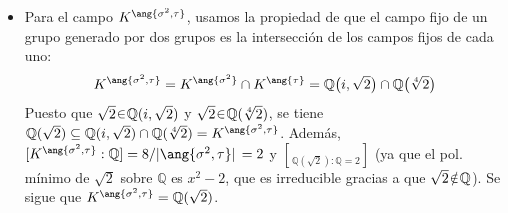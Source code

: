 \begin{sol}
\begin{enumerate}[label=\alph*)]
\begin{itemize}
    \item 
    Para el campo $K^{\ang{\sigma^2,\tau}}$, usamos la propiedad de que el campo fijo de un grupo generado por dos grupos es la intersección de los campos fijos de cada uno: 
    \[
    K^{\ang{\sigma^2,\tau}} = K^{\ang{\sigma^2}} \cap K^{\ang{\tau}} = \mathbb{Q}\big(i,\sqrt{2}\big) \cap \mathbb{Q}\big(\sqrt[4]{2}\big)
    \]
    Puesto que $\sqrt{2} \en \mathbb{Q}(i,\sqrt{2})$ y $\sqrt{2} \en \mathbb{Q}(\sqrt[4]{2})$, se tiene $\mathbb{Q}(\sqrt{2}) \subseteq \mathbb{Q}(i,\sqrt{2}) \cap \mathbb{Q}(\sqrt[4]{2}) = K^{\ang{\sigma^2,\tau}}$. Además, $\brack{K^{\ang{\sigma^2,\tau}}:\mathbb{Q}} = 8/\abs*{\ang{\sigma^2,\tau}} = 2$ y $\brack{\mathbb{Q}(\sqrt{2}):\mathbb{Q}} = 2$ (ya que el pol. mínimo de $\sqrt{2}$ sobre $\mathbb{Q}$ es $x^2 -2$, que es irreducible gracias a que $\sqrt{2} \noten \mathbb{Q}$). Se sigue que $K^{\ang{\sigma^2,\tau}} =\mathbb{Q}(\sqrt{2})$.
    

\end{itemize}
\end{enumerate}
\end{sol}

